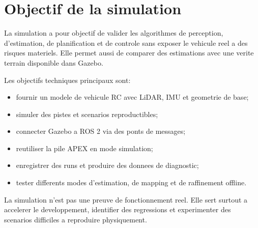 \section{Objectif de la simulation}

La simulation a pour objectif de valider les algorithmes de perception, d'estimation, de planification et de controle sans exposer le vehicule reel a des risques materiels. Elle permet aussi de comparer des estimations avec une verite terrain disponible dans Gazebo.

Les objectifs techniques principaux sont:

\begin{itemize}
  \item fournir un modele de vehicule RC avec LiDAR, IMU et geometrie de base;
  \item simuler des pistes et scenarios reproductibles;
  \item connecter Gazebo a ROS 2 via des ponts de messages;
  \item reutiliser la pile APEX en mode simulation;
  \item enregistrer des runs et produire des donnees de diagnostic;
  \item tester differents modes d'estimation, de mapping et de raffinement offline.
\end{itemize}

La simulation n'est pas une preuve de fonctionnement reel. Elle sert surtout a accelerer le developpement, identifier des regressions et experimenter des scenarios difficiles a reproduire physiquement.

